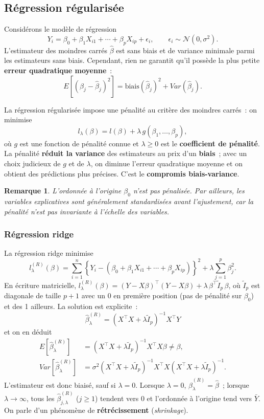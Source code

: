 \documentclass[11pt,letterpaper]{article}
\newtheorem{remarque}{Remarque}[section]
\begin{document}
\subsection{Régression régularisée}

Considérons le modèle de régression
$$Y_i = \beta_0 + \beta_1 X_{i1} + \cdots + \beta_p X_{ip} + \epsilon_i, \qquad \epsilon_i \sim \mathcal{N}(0,\sigma^2).$$
L'estimateur des moindres carrés $\hat\beta$ est sans biais et de variance minimale parmi les estimateurs sans biais. Cependant, rien ne garantit qu'il possède la plus petite \textbf{erreur quadratique moyenne}~:
$$E\left[(\beta_j - \hat\beta_j)^2\right] = \mbox{biais}(\hat\beta_j)^2 + Var(\hat\beta_j).$$

La régression régularisée impose une pénalité au critère des moindres carrés~: on minimise
$$l_\lambda(\beta) = l(\beta) + \lambda\, g(\beta_1,\ldots,\beta_p),$$
où $g$ est une fonction de pénalité connue et $\lambda \geq 0$ est le \textbf{coefficient de pénalité}. La pénalité \textbf{réduit la variance} des estimateurs au prix d'un \textbf{biais}~; avec un choix judicieux de $g$ et de $\lambda$, on diminue l'erreur quadratique moyenne et on obtient des prédictions plus précises. C'est le \textbf{compromis biais-variance}.

\begin{remarque}
L'ordonnée à l'origine $\beta_0$ n'est pas pénalisée. Par ailleurs, les variables explicatives sont généralement standardisées avant l'ajustement, car la pénalité n'est pas invariante à l'échelle des variables.
\end{remarque}

\subsubsection{Régression ridge}

La régression ridge minimise
$$l^{(R)}_\lambda(\beta) = \sum_{i=1}^n\left\{Y_i - (\beta_0 + \beta_1 X_{i1} + \cdots + \beta_p X_{ip})\right\}^2 + \lambda\sum_{j=1}^p\beta_j^2.$$
En écriture matricielle, $l^{(R)}_\lambda(\beta) = (Y - X\beta)^\top(Y-X\beta) + \lambda\,\beta^\top\tilde I_p\,\beta$, où $\tilde I_p$ est diagonale de taille $p+1$ avec un 0 en première position (pas de pénalité sur $\beta_0$) et des 1 ailleurs. La solution est explicite~:
$$\boxed{\hat\beta^{(R)}_\lambda = (X^\top X + \lambda\tilde I_p)^{-1}X^\top Y}$$
et on en déduit
\begin{align*}
E[\hat\beta^{(R)}_\lambda] &= (X^\top X + \lambda\tilde I_p)^{-1}X^\top X\beta \neq \beta,\\
Var[\hat\beta^{(R)}_\lambda] &= \sigma^2(X^\top X + \lambda\tilde I_p)^{-1}X^\top X(X^\top X + \lambda\tilde I_p)^{-1}.
\end{align*}
L'estimateur est donc biaisé, sauf si $\lambda = 0$. Lorsque $\lambda = 0$, $\hat\beta^{(R)}_\lambda = \hat\beta$~; lorsque $\lambda\to\infty$, tous les $\hat\beta^{(R)}_{j,\lambda}$ ($j\geq1$) tendent vers 0 et l'ordonnée à l'origine tend vers $\bar Y$. On parle d'un phénomène de \textbf{rétrécissement} (\textit{shrinkage}).
\end{document}
